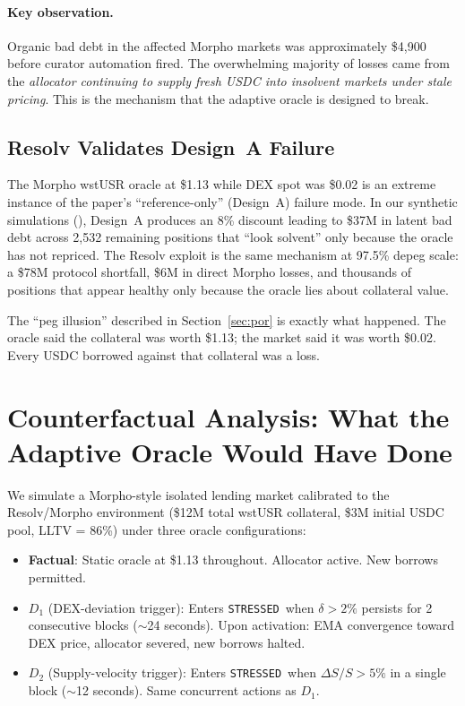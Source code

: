 \documentclass[11pt]{article}
\newcommand{\STRESSED}{\texttt{STRESSED}}
\begin{document}
\paragraph{Key observation.} Organic bad debt in the affected Morpho markets was approximately \$4,900 before curator automation fired. The overwhelming majority of losses came from the \emph{allocator continuing to supply fresh USDC into insolvent markets under stale pricing}. This is the mechanism that the adaptive oracle is designed to break.

\subsection{Resolv Validates Design~A Failure}
\label{sec:resolv_validates}

The Morpho wstUSR oracle at \$1.13 while DEX spot was \$0.02 is an extreme instance of the paper's ``reference-only'' (Design~A) failure mode. In our synthetic simulations (), Design~A produces an 8\% discount leading to \$37M in latent bad debt across 2,532 remaining positions that ``look solvent'' only because the oracle has not repriced. The Resolv exploit is the same mechanism at 97.5\% depeg scale: a \$78M protocol shortfall, \$6M in direct Morpho losses, and thousands of positions that appear healthy only because the oracle lies about collateral value.

The ``peg illusion'' described in Section~\ref{sec:por} is exactly what happened. The oracle said the collateral was worth \$1.13; the market said it was worth \$0.02. Every USDC borrowed against that collateral was a loss.

\section{Counterfactual Analysis: What the Adaptive Oracle Would Have Done}
\label{sec:resolv_counterfactual}

We simulate a Morpho-style isolated lending market calibrated to the Resolv/Morpho environment (\$12M total wstUSR collateral, \$3M initial USDC pool, LLTV = 86\%) under three oracle configurations:

\begin{itemize}[leftmargin=*]
\item \textbf{Factual}: Static oracle at \$1.13 throughout. Allocator active. New borrows permitted.
\item \textbf{$D_1$} (DEX-deviation trigger): Enters \STRESSED\ when $\delta > 2\%$ persists for 2 consecutive blocks ($\sim$24 seconds). Upon activation: EMA convergence toward DEX price, allocator severed, new borrows halted.
\item \textbf{$D_2$} (Supply-velocity trigger): Enters \STRESSED\ when $\Delta S / S > 5\%$ in a single block ($\sim$12 seconds). Same concurrent actions as $D_1$.
\end{itemize}
\end{document}
